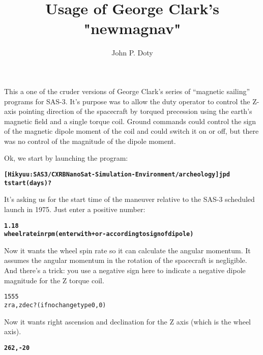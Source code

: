 \documentclass[11pt]{article}
\title{Usage of George Clark's "newmagnav"}
\author{John P. Doty}
\begin{document}
\maketitle

This a one of the cruder versions of George Clark's series of ``magnetic sailing'' programs for SAS-3. It's purpose was to allow the duty operator to control the Z-axis pointing direction of the spacecraft by torqued precession using the earth's magnetic field and a single torque coil. Ground commands could control the sign of the magnetic dipole moment of the coil and could switch it on or off, but there was no control of the magnitude of the dipole moment.

Ok, we start by launching the program:
\begin{alltt}
\bfseries
[Hikyuu:SAS3/CXRBNanoSat-Simulation-Environment/archeology] jpd% ./newmagnav
      tstart (days)?
\end{alltt}   
It's asking us for the start time of the maneuver relative to the SAS-3 scheduled launch in 1975. Just enter a positive number:
\begin{alltt}
\bfseries
1.18
      wheel rate in rpm (enter with + or - according to sign of dipole)
\end{alltt}

Now it wants the wheel spin rate so it can calculate the angular momentum. It assumes the angular momentum in the rotation of the spacecraft is negligible. And there's a trick: you use a negative sign here to indicate a negative dipole magnitude for the Z torque coil.
\begin{alltt}
\bfseries

1555
      zra,zdec? (if no change type 0,0)
\end{alltt}
Now it wants right ascension and declination for the Z axis (which is the wheel axis).
\begin{alltt}
\bfseries
262,-20
\end{alltt}
\end{document}
